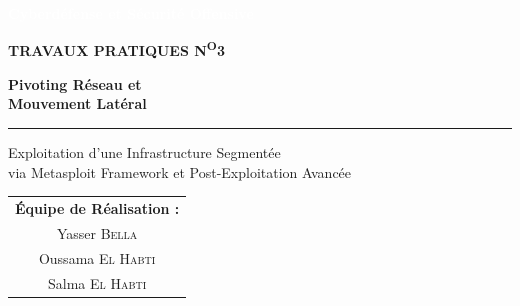 \documentclass[12pt,a4paper,openany]{report}
\begin{document}
	\sloppy
	
	\begin{titlepage}
		\thispagestyle{empty}
		
		\noindent
		\colorbox{primary}{%
			\parbox{\dimexpr\textwidth-2\fboxsep}{%
				\vspace{0.6cm}
				\centering
				{\large\bfseries\textcolor{white}{Cyberdéfense et Sécurité Offensive}}\\[0.6cm]
			}%
		}
		
		\vspace{1.5cm}
		\centering
		
		{\normalsize\bfseries\color{black!40}\MakeUppercase{Travaux Pratiques N\textsuperscript{o}3}}
		
		\vspace{0.8cm}
		
		{\Huge\bfseries\color{primary}
			Pivoting Réseau et\\[0.3cm]
			Mouvement Latéral\par
		}
		
		\vspace{0.5cm}
		
		{\color{accent}\rule{7cm}{1.5pt}\par}
		
		\vspace{0.5cm}
		
		{\large\color{black!60}
			Exploitation d'une Infrastructure Segmentée\\[0.2cm]
			via Metasploit Framework et Post-Exploitation Avancée\par
		}
		
		\vspace{2cm}
		
		{\large
			\renewcommand{\arraystretch}{1.5}
			\begin{tabular}{c}
				\textbf{\color{primary}Équipe de Réalisation :}\\[0.3cm]
				Yasser \textsc{Bella} \\
				Oussama \textsc{El Habti} \\
				Salma \textsc{El Habti} \\[0.6cm]
				

\end{tabular}}
\end{titlepage}
\end{document}
